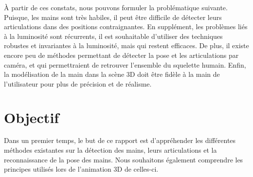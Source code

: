 À partir de ces constats, nous pouvons formuler la problématique 
suivante. Puisque, 
les mains sont très habiles, il peut être difficile de détecter leurs 
articulations dans des positions contraignantes. En supplément, les 
problèmes liés à la luminosité sont récurrents, il est souhaitable 
d'utiliser des techniques robustes et invariantes à la luminosité, 
mais qui restent efficaces. De plus, il existe encore peu de méthodes 
permettant de détecter la pose et les articulations par caméra, et 
qui permettraient de retrouver l'ensemble du squelette humain. Enfin, 
la modélisation de la main dans la scène 3D doit être fidèle à 
la main de l'utilisateur pour plus de précision et de réalisme.

\section{Objectif}
%
%
%
%

Dans un premier temps, le but de ce rapport est d'appréhender les 
différentes méthodes existantes sur la détection des mains, leurs 
articulations et la reconnaissance de la pose des mains. Nous souhaitons
également comprendre les principes utilisés lors de l'animation 3D de
celles-ci.\\ 

